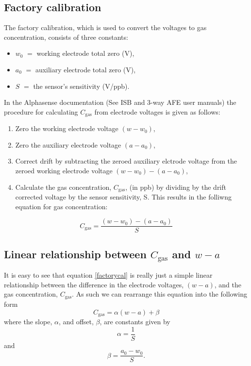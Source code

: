 \documentclass[letterpaper]{article}
\newcommand{\cgas}{C_{\mathrm{gas}}}
\newcommand{\wrk}{w}
\newcommand{\aux}{a}
\begin{document}
\subsection{Factory calibration}
The factory calibration, which is used to convert the voltages to gas
concentration,  consists of three constants:
\begin{itemize}
    \item $\wrk_0$ $=$  working electrode total zero (V),
    \item $\aux_0$ $=$  auxiliary electrode total zero (V),
    \item $S$ $=$  the sensor's sensitivity (V/ppb).
\end{itemize}

In the Alphasense documentation (See ISB and 3-way AFE user manuals) the procedure for calculating
$\cgas$ from electrode voltages is given as follows: 

\begin{enumerate}
    \item Zero the working electrode voltage $(\wrk - \wrk_0)$, 
    \item Zero the auxiliary electrode voltage $(\aux - \aux_0)$, 
    \item Correct drift by subtracting the zeroed auxiliary elctrode voltage from the zeroed
        working electrode voltage $(\wrk - \wrk_0) - (\aux - \aux_0)$,  
    
    \item Calculate the gas concentration, $\cgas$,  (in ppb) by dividing by the
        drift corrected voltage by the sensor sensitivity, S. This results in
        the folliwng equation for gas concentration: 

\end{enumerate}

\begin{equation} \label{factorycal}
    \cgas = \frac{(\wrk - \wrk_0) - (\aux - \aux_0)}{S}
\end{equation}

\subsection{Linear relationship between $\cgas$ and $\wrk-\aux$}
It is easy to see that equation \ref{factorycal} is really just a simple
linear relationship between the difference in the electrode voltages,
$(\wrk-\aux)$, and the gas concentration, $\cgas$.  As such we can rearrange
this equation into the following form
\begin{equation} \label{linearcal}
    \cgas= \alpha (\wrk - \aux) + \beta
\end{equation}
where the slope, $\alpha$, and offset, $\beta$, are constants given by
\begin{equation}
    \alpha = \frac{1}{S}
\end{equation}
and
\begin{equation}
    \beta = \frac{\aux_0 - \wrk_0}{S}.
\end{equation}
\end{document}
